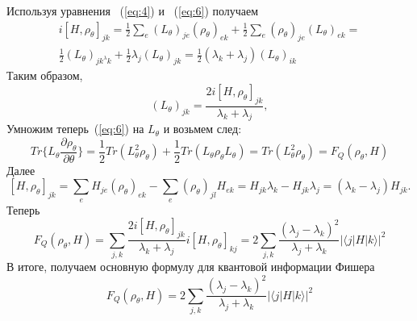 Используя уравнения ~(\ref{eq:4}) и ~(\ref{eq:6}) получаем 
%
\begin{multline}
    \label{eq:7}
        i \left[H,\rho_\theta \right]_{jk} =
            \frac{1}{2} \sum_e \left(L_\theta \right)_{je} 
                \left(\rho_\theta \right)_{ek} +
                    \frac{1}{2} \sum_e \left(\rho_\theta \right)_{je} 
                        \left(L_\theta \right)_{ek} =\\
                    \frac{1}{2}\left(L_\theta \right)_{{jk}^{\lambda} k} +
                \frac{1}{2}\lambda_j \left(L_\theta \right)_{jk} = 
        \frac{1}{2} \left(\lambda_k + \lambda_j \right)
    \left(L_\theta \right)_{ik}
\end{multline}
%
Таким образом, 
\begin{equation}
    \label{eq:8}
        \left(L_\theta \right)_{jk} =
            \frac{2i\left[H,\rho_\theta \right]_{jk}}{\lambda_k + \lambda_j},
\end{equation}
%
Умножим теперь~(\ref{eq:6}) на $L_\theta$ и возьмем след: 
%
\begin{equation}
    \label{eq:9}
        Tr\Bigg\{L_\theta \frac{\partial \rho_\theta}{\partial \theta} \Bigg\} =
            \frac{1}{2} Tr\left(L^2_\theta \rho_\theta \right) +
                \frac{1}{2} Tr\left(L_\theta \rho_\theta L_\theta \right) =
            Tr \left(L^2_\theta \rho_\theta \right) = 
        F_Q \left(\rho_\theta, H \right)
\end{equation}
%
Далее 
%
\begin{equation}
    \label{eq:10}
        \left[H, \rho_\theta \right]_{jk} = \sum_e H_{je} 
            \left(\rho_\theta \right)_{ek} - 
                \sum_e \left(\rho_\theta \right)_{jl}H_{ek} =
            H_{jk}\lambda_k - H_{jk}\lambda_j = 
        \left(\lambda_k - \lambda_j \right) H_{jk}.
\end{equation}
%
Теперь 
%
\begin{equation}
    \label{eq:11}
        F_Q \left(\rho_\theta, H \right) = 
            \sum_{j,k}\frac{2i\left[H,\rho_\theta \right]_{jk}}
                {\lambda_k + \lambda_j}
                    i \left[H, \rho_\theta \right]_{kj} = 
                2\sum_{j,k} \frac{\left(\lambda_j - \lambda_k \right)^2}
            {\lambda_j + \lambda_k}
        \left| \langle j|H|k \rangle \right|^2
\end{equation}
%
В итоге, получаем основную формулу для квантовой информации Фишера 
%
\begin{equation}\label{eq:quantum-fisher-information}
        F_Q \left(\rho_\theta, H \right) = 
            2\sum_{j,k} \frac{\left(\lambda_j - \lambda_k \right)^2}
                {\lambda_j + \lambda_k}
            \left| \langle j|H|k \rangle \right|^2
\end{equation}

